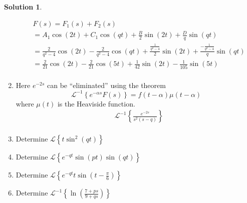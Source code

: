 \documentclass[10pt]{article}
\theoremstyle{definition}
\newtheorem{soln}{Solution}
\newcommand{\laplace}{\mathcal{L}}
\begin{document}
\begin{soln}
\begin{enumerate}[label=(\alph*)]
          \begin{align*}
            & F(s)=F_1(s)+F_2(s)\\
            & =A_1\cos\left(2t\right)+C_1\cos\left(qt\right)+\frac{B}{2}\sin\left(2t\right)+\frac{D}{q}\sin\left(qt\right)\\
            & =\frac{2}{q^2-4}\cos\left(2t\right)-\frac{2}{q^2-4}\cos\left(qt\right)+\frac{\frac{1}{q^2-4}}{2}\sin\left(2t\right)+\frac{-\frac{1}{q^2-4}}{q}\sin\left(qt\right)\\
            & =\frac{2}{21}\cos\left(2t\right)-\frac{2}{21}\cos\left(5t\right)+\frac{1}{42}\sin\left(2t\right)-\frac{1}{105}\sin\left(5t\right)\\
          \end{align*}
    \item Here $e^{-2s}$ can be ``eliminated'' using the theorem $$\laplace^{-1}\left\{e^{-\alpha s}F(s)\right\}=f(t-\alpha)\mu(t-\alpha)$$ where $\mu(t)$ is the Heaviside function. 
    \begin{align*}
      & \laplace^{-1}\left\{\frac{e^{-2s}}{s^2\left(s-q\right)}\right\}\\
    \end{align*}
    \item Determine $\laplace\left\{t\sin^2\left(qt\right)\right\}$
    \item Determine $\laplace\left\{e^{-qt}\sin\left(pt\right)\sin\left(qt\right)\right\}$
    \item Determine $\laplace\left\{e^{-qt}t\sin\left(t-\frac{\pi}{6}\right)\right\}$
    \item Determine $\laplace^{-1}\left\{\ln\left(\frac{7+ps}{9+qs}\right)\right\}$
  \end{enumerate}
\end{soln}
\end{document}

